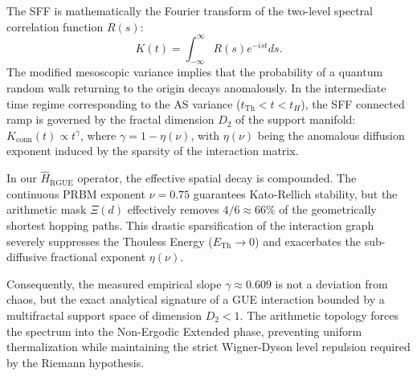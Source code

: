 \documentclass[aps,prl,preprint,superscriptaddress,floatfix]{revtex4-2}
\begin{document}
The SFF is mathematically the Fourier transform of the two-level spectral correlation function $R(s)$:
\begin{equation}
K(t) = \int_{-\infty}^{\infty} R(s) e^{-ist} ds.
\end{equation}
The modified mesoscopic variance implies that the probability of a quantum random walk returning to the origin decays anomalously. In the intermediate time regime corresponding to the AS variance ($t_{\text{Th}} < t < t_H$), the SFF connected ramp is governed by the fractal dimension $D_2$ of the support manifold: $K_{\text{conn}}(t) \propto t^{\gamma}$, where $\gamma = 1 - \eta(\nu)$, with $\eta(\nu)$ being the anomalous diffusion exponent induced by the sparsity of the interaction matrix. 

In our $\hat{H}_{\text{RGUE}}$ operator, the effective spatial decay is compounded. The continuous PRBM exponent $\nu=0.75$ guarantees Kato-Rellich stability, but the arithmetic mask $\Xi(d)$ effectively removes $4/6 \approx 66\%$ of the geometrically shortest hopping paths. This drastic sparsification of the interaction graph severely suppresses the Thouless Energy ($E_{\text{Th}} \to 0$) and exacerbates the sub-diffusive fractional exponent $\eta(\nu)$.

Consequently, the measured empirical slope $\gamma \approx 0.609$ is not a deviation from chaos, but the exact analytical signature of a GUE interaction bounded by a multifractal support space of dimension $D_2 < 1$. The arithmetic topology forces the spectrum into the Non-Ergodic Extended phase, preventing uniform thermalization while maintaining the strict Wigner-Dyson level repulsion required by the Riemann hypothesis.



\end{document}
